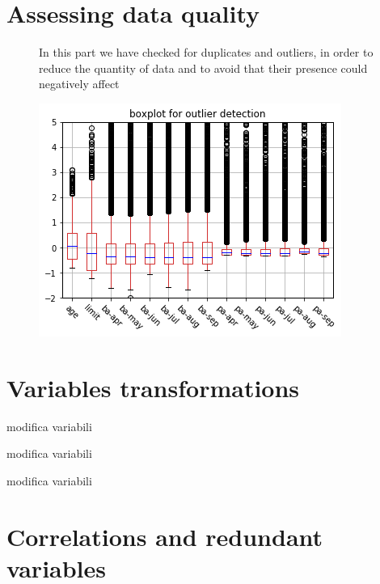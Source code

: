 \clearpage

\section{Assessing data quality}

\begin{figure}[h]
  \begin{minipage}[h]{.60\textwidth}

    In this part we have checked for duplicates and outliers, in order to reduce the quantity of data and to avoid that their presence could negatively affect
  \end{minipage}
  \begin{minipage}[h]{.40\textwidth}
    \includegraphics[width=.95\textwidth]{img/ch2/outlier}
  \end{minipage}
\end{figure}

\section{Variables transformations}

modifica variabili

modifica variabili

modifica variabili



\section{Correlations and redundant variables}

